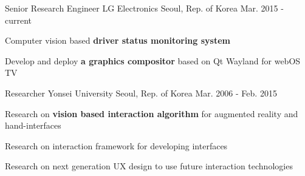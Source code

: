 


\begin{cventries}

  \cventry
    {Senior Research Engineer} %
    {LG Electronics} %
    {Seoul, Rep. of Korea} %
    {Mar. 2015 - current} %
    {
      \begin{cvitems} %
        \item {Computer vision based \textbf{driver status monitoring system}}
        \item {Develop and deploy \textbf{a graphics compositor} based on Qt Wayland for webOS TV}
      \end{cvitems}
    }


  \cventry
    {Researcher} %
    {Yonsei University} %
    {Seoul, Rep. of Korea} %
    {Mar. 2006 - Feb. 2015} %
    {
      \begin{cvitems} %
        \item {Research on \textbf{vision based interaction algorithm} for augmented reality and hand-interfaces}
        \item {Research on interaction framework for developing interfaces}
        \item {Research on next generation UX design to use future interaction technologies}
      \end{cvitems}
    }

\end{cventries}
